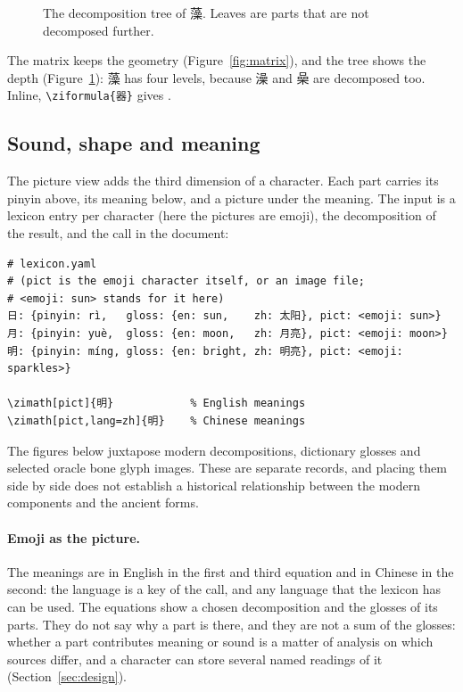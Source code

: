 \documentclass[11pt]{article}
\newcommand{\cmd}[1]{\texttt{\textbackslash #1}}
\begin{document}
\begin{figure}[ht]
\centering
{}
\caption{The decomposition tree of 藻. Leaves are parts that are not decomposed further.}
\label{fig:tree}
\end{figure}

\noindent The matrix keeps the geometry (Figure~\ref{fig:matrix}), and the tree shows the depth (Figure~\ref{fig:tree}): 藻 has four levels, because 澡 and 喿 are decomposed too.
Inline, \cmd{ziformula}\texttt{\{器\}} gives \unskip.

\subsection{Sound, shape and meaning}
The picture view adds the third dimension of a character. Each part carries its pinyin above, its meaning below, and a picture under the meaning.
The input is a lexicon entry per character (here the pictures are emoji), the decomposition of the result, and the call in the document:

\begin{verbatim}
# lexicon.yaml   
# (pict is the emoji character itself, or an image file; 
# <emoji: sun> stands for it here)
日: {pinyin: rì,   gloss: {en: sun,    zh: 太阳}, pict: <emoji: sun>}
月: {pinyin: yuè,  gloss: {en: moon,   zh: 月亮}, pict: <emoji: moon>}
明: {pinyin: míng, gloss: {en: bright, zh: 明亮}, pict: <emoji: sparkles>}

\zimath[pict]{明}            % English meanings
\zimath[pict,lang=zh]{明}    % Chinese meanings
\end{verbatim}

\noindent The figures below juxtapose modern decompositions, dictionary glosses and selected oracle bone glyph images. These are separate
records, and placing them side by side does not establish a historical relationship between the modern components and the ancient forms.

\paragraph{Emoji as the picture.}

\noindent The meanings are in English in the first and third equation and in Chinese in the second: the language is a key of the call, and any language
that the lexicon has can be used. The equations show a chosen decomposition and the glosses of its parts. They do not say why a part is there, and
they are not a sum of the glosses: whether a part contributes meaning or sound is a matter of analysis on which sources differ, and a character can store
several named readings of it (Section~\ref{sec:design}).
\end{document}
